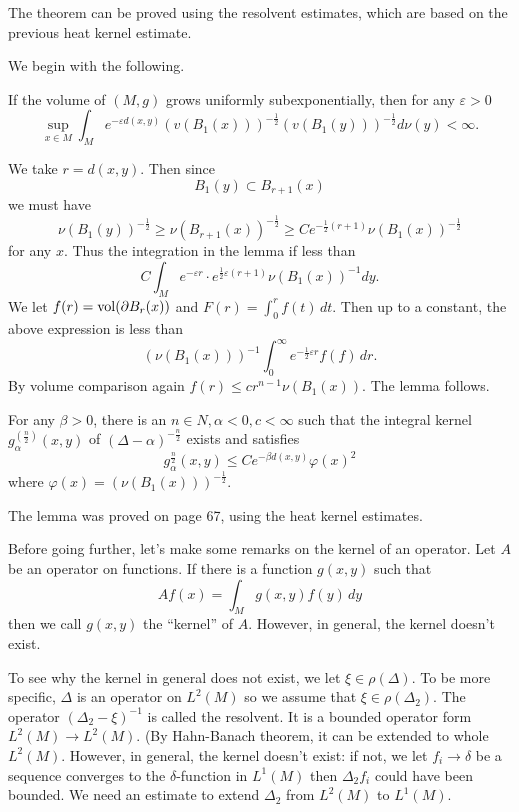 The theorem can be proved using the resolvent estimates, which are based on the previous heat kernel estimate. 

We begin with the following.

\begin{lemma} If the volume of $ (M, g) $ grows uniformly subexponentially, then for any $ \varepsilon > 0 $ 
\[ \sup_{x \in M} \int_M e ^{-\varepsilon d (x, y)} (v (B_1 (x))) ^{-\frac{1}{2}} ( v (B _1 (y))) ^{-\frac{1}{2}} d \nu (y) < \infty.\]
\end{lemma}

 We take $ r = d (x, y) $. Then since 
%
\[ B_1 (y) \subset B_{r+1} (x) \]
%
we must have 
%
\[\nu (B_1 (y)) ^{-\frac{1}{2}} \geq \nu (B_{r+1} (x)) ^{-\frac{1}{2}} \geq C e ^{-\frac{1}{2}(r+1)}\nu (B_1(x)) ^{-\frac{1}{2}}\]
%
for any $ x$. Thus the integration in the lemma if less than
%
\[ C \int_M e^{-\varepsilon  r} \cdot e ^{\frac{1}{2}\varepsilon (r + 1)} \nu (B_1(x)) ^{-1} dy .\]
%
We let $ f (r) = {\rm vol} (\partial B_r (x)) $ and $ F (r) = \int^r_0 f(t) \, dt $. Then up to a constant, the above expression is less than 
%
\[ (\nu (B_1 (x)) ) ^{-1} \int^\infty_0 e ^{-\frac{1}{2}\varepsilon r} f (f) \, dr. \]
%
By volume comparison again $ f(r) \leq c r ^{n-1} \nu (B _1 (x)) .$
The lemma follows.

\begin{lemma} For any $ \beta > 0 $, there is an $ n \in N, \alpha < 0 , c < \infty $ such that the integral kernel $ g _\alpha ^{(\frac{n}{2})} (x, y) $ of $ (\Delta - \alpha) ^{-\frac{n}{2}} $ exists and satisfies 
%
\[g_\alpha ^{\frac{n}{2}} (x, y) \leq C e ^{-\beta d (x, y)} \varphi(x)^2 \]
%
where $ \varphi (x) = ( \nu (B_1 (x))) ^{-\frac{1}{2}} $.

The lemma was proved on page 67, using the heat kernel estimates.
\end{lemma}
Before going further, let's make some remarks on the kernel of an operator. Let $ A$ be an operator on functions. If there is a function $ g(x, y) $ such that
%
\[ A f (x) = \int_M g (x, y) f (y) \, dy \]
%
then we call $ g (x, y) $ the ``kernel'' of $A$. However, in general, the kernel doesn't exist.

To see why the kernel in general does not exist, we let $ \xi \in \rho (\Delta ) $. To be more specific, $ \Delta $ is an operator on $ L^2 (M) $ so we assume that $ \xi \in \rho (\Delta_2) $. The operator $ ( \Delta _2 - \xi) ^{-1} $ is called the resolvent. It is a bounded operator form
$ L^2(M) \rightarrow L^2 (M) $. (By Hahn-Banach theorem, it can be extended to whole $ L^2(M)$. However, in general, the kernel doesn't exist: if not, we let $ f_i \rightarrow \delta $ be a sequence converges to the $ \delta$-function in $ L^1(M) $ then $ \Delta _2f_i $ could have been bounded. We need an  estimate to extend $ \Delta _2 $ from $ L^2 (M) $ to $ L^1(M)$.


